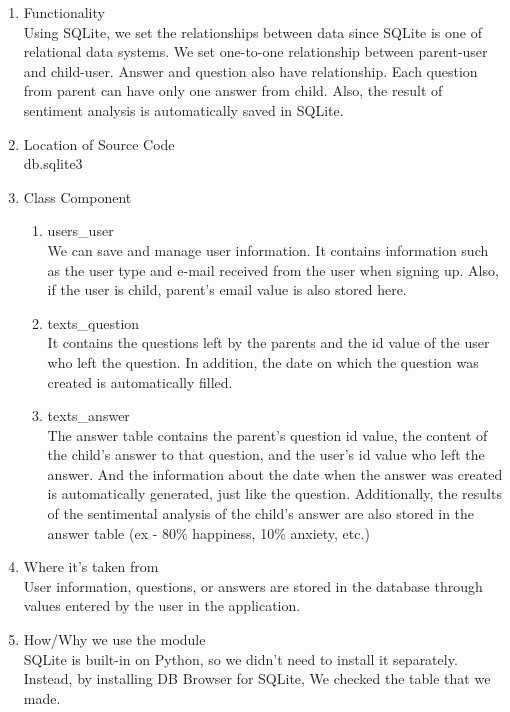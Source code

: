 \documentclass[conference]{IEEEtran}
\begin{document}
\begin{enumerate}
\begin{enumerate}
            \newline
            \item Functionality
            \\Using SQLite, we set the relationships between data since SQLite is one of relational data systems. We set one-to-one relationship between parent-user and child-user. Answer and question also have relationship. Each question from parent can have only one answer from child. Also, the result of sentiment analysis is automatically saved in SQLite.
            \newline
            \item Location of Source Code
            \\db.sqlite3
            \newline
            \item Class Component
            \begin{enumerate}
                \item users\_user
                \\We can save and manage user information. It contains information such as the user type and e-mail received from the user when signing up. Also, if the user is child, parent's email value is also stored here.
                \newline
                \item texts\_question
                \\It contains the questions left by the parents and the id value of the user who left the question. In addition, the date on which the question was created is automatically filled.
                \newline
                \item texts\_answer
                \\The answer table contains the parent's question id value, the content of the child's answer to that question, and the user's id value who left the answer. And the information about the date when the answer was created is automatically generated, just like the question. Additionally, the results of the sentimental analysis of the child's answer are also stored in the answer table (ex - 80\% happiness, 10\% anxiety, etc.)  
                \newline
            \end{enumerate}

            \item Where it’s taken from
            \\User information, questions, or answers are stored in the database through values entered by the user in the application.
            \newline
            \item How/Why we use the module
            \\SQLite is built-in on Python, so we didn’t need to install it separately. Instead, by installing DB Browser for SQLite, We checked the table that we made.
            

\end{enumerate}
\end{enumerate}
\end{document}
